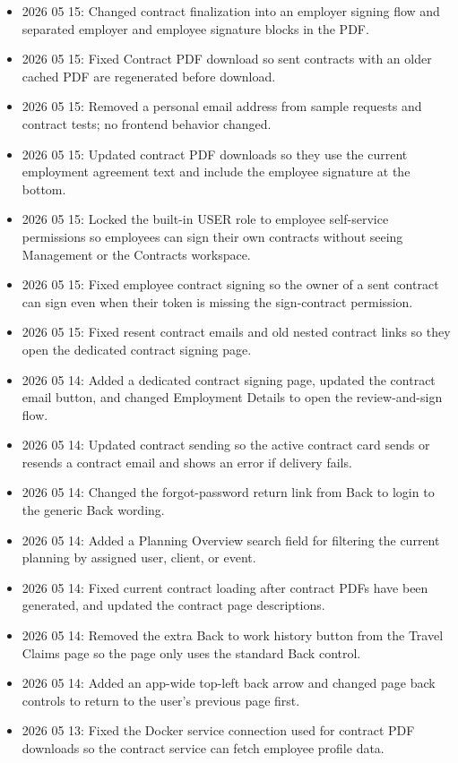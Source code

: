 \documentclass[11pt]{article}
\begin{document}
\begin{itemize}
    \item 2026 05 15: Changed contract finalization into an employer signing flow and separated employer and employee signature blocks in the PDF.
    \item 2026 05 15: Fixed Contract PDF download so sent contracts with an older cached PDF are regenerated before download.
    \item 2026 05 15: Removed a personal email address from sample requests and contract tests; no frontend behavior changed.
    \item 2026 05 15: Updated contract PDF downloads so they use the current employment agreement text and include the employee signature at the bottom.
    \item 2026 05 15: Locked the built-in USER role to employee self-service permissions so employees can sign their own contracts without seeing Management or the Contracts workspace.
    \item 2026 05 15: Fixed employee contract signing so the owner of a sent contract can sign even when their token is missing the sign-contract permission.
    \item 2026 05 15: Fixed resent contract emails and old nested contract links so they open the dedicated contract signing page.
    \item 2026 05 14: Added a dedicated contract signing page, updated the contract email button, and changed Employment Details to open the review-and-sign flow.
    \item 2026 05 14: Updated contract sending so the active contract card sends or resends a contract email and shows an error if delivery fails.
    \item 2026 05 14: Changed the forgot-password return link from Back to login to the generic Back wording.
    \item 2026 05 14: Added a Planning Overview search field for filtering the current planning by assigned user, client, or event.
    \item 2026 05 14: Fixed current contract loading after contract PDFs have been generated, and updated the contract page descriptions.
    \item 2026 05 14: Removed the extra Back to work history button from the Travel Claims page so the page only uses the standard Back control.
    \item 2026 05 14: Added an app-wide top-left back arrow and changed page back controls to return to the user's previous page first.
    \item 2026 05 13: Fixed the Docker service connection used for contract PDF downloads so the contract service can fetch employee profile data.

\end{itemize}
\end{document}
